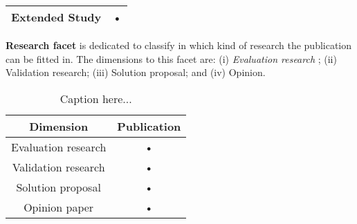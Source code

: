 \begin{description}
\begin{table}[h]
\begin{center}
\begin{tabular}{|c|c|}
\hline 
Extended Study & • \\ 
\hline 
\end{tabular}
\end{center}
\end{table}
\item \textbf{Research facet} is dedicated to classify in which kind of research the publication can be fitted in. The dimensions to this facet are: (i) \textit{Evaluation research} ; (ii) Validation research; (iii) Solution proposal; and (iv) Opinion.
\begin{table}[h]
\caption{Caption here...}
\begin{center}
\begin{tabular}{|c|c|}
\hline 
\textbf{Dimension} & \textbf{Publication} \\ 
\hline 
Evaluation research & • \\ 
\hline 
Validation research & • \\ 
\hline 
Solution proposal & • \\ 
\hline 
Opinion paper & • \\ 
\hline  
\end{tabular}
\end{center}
\end{table}
\end{description}